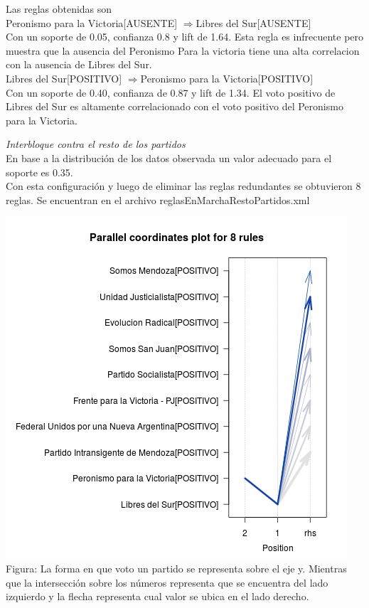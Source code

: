 \documentclass{endm}
\begin{document}
Las reglas obtenidas son \\

{Peronismo para la Victoria[AUSENTE]} $\Longrightarrow${Libres del Sur[AUSENTE]}  \\ 

Con un soporte  de 0.05, confianza 0.8 y lift de 1.64. Esta regla es infrecuente pero muestra que la ausencia del Peronismo Para la victoria tiene una alta correlacion con la ausencia de Libres del Sur. \\ 

{Libres del Sur[POSITIVO]}  $\Longrightarrow${Peronismo para la Victoria[POSITIVO]} \\ 

Con un soporte de 0.40, confianza de 0.87 y lift de 1.34. El voto positivo de Libres del Sur es altamente correlacionado con el voto positivo del Peronismo para la Victoria. \\

\newpage 

\textit{Interbloque contra el resto de los partidos} \\

En base a la distribución de los datos observada un valor adecuado para el soporte es 0.35. \\

Con esta configuración y luego de eliminar las reglas redundantes se obtuvieron 8 reglas. Se encuentran en el archivo reglasEnMarchaRestoPartidos.xml  \\

\begin{center}
\includegraphics[scale=0.5]{graficos/paracoordEnMarchaPartidos.png} \\
\scriptsize{Figura: La forma en que voto un partido se representa sobre el eje y. Mientras que la intersección sobre  los números representa que se encuentra del lado izquierdo y la flecha representa cual valor se ubica en el lado derecho.} \\
\end{center} 
\end{document}
